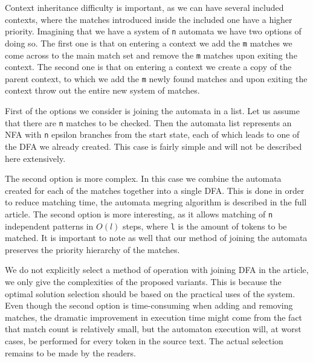 Context inheritance difficulty is important, as we can have several included
contexts, where the matches introduced inside the included one have a higher
priority. Imagining that we have a system of \verb/n/ automata we have two
options of doing so. The first one is that on entering a context we add the
\verb/m/ matches we come across to the main match set and remove the \verb/m/
matches upon exiting the context. The second one is that on entering a context
we create a copy of the parent context, to which we add the \verb/m/ newly
found matches and upon exiting the context throw out the entire new system of
matches.

First of the options we consider is joining the automata in a list. Let us
assume that there are \verb/n/ matches to be checked. Then the automata list
represents an NFA with \verb/n/ epsilon branches from the start state, each of
which leads to one of the DFA we already created. This case is fairly simple
and will not be described here extensively.

The second option is more complex. In this case we combine the automata created
for each of the matches together into a single DFA. This is done in order to
reduce matching time, the automata megring algorithm is described in the full
article.  The second option is more interesting, as it allows matching of
\verb/n/ independent patterns in $O(l)$ steps, where \verb/l/ is the amount
of tokens to be matched. It is important to note as well that our method of
joining the automata preserves the priority hierarchy of the matches. 

We do not explicitly select a method of operation with joining DFA in the
article, we only give the complexities of the proposed variants. This is
because the optimal solution selection should be based on the practical uses of
the system. Even though the second option is time-consuming when adding and
removing matches, the dramatic improvement in execution time might come from
the fact that match count is relatively small, but the automaton execution
will, at worst cases, be performed for every token in the source text. The
actual selection remains to be made by the readers.

